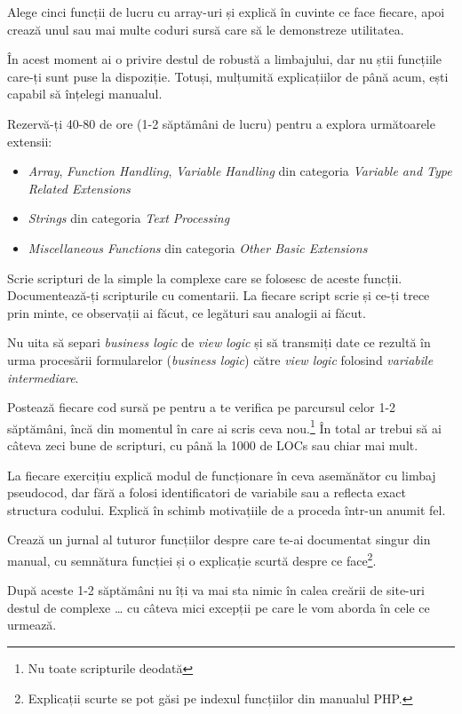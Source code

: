 \begin{Exercise}[title={Înțelege manualul}]
Alege cinci funcții de lucru cu array-uri și
explică în cuvinte ce face fiecare, apoi crează
unul sau mai multe coduri sursă care să le demonstreze
utilitatea.
\end{Exercise}
\begin{Exercise}[difficulty=3,title={Explorează manualul}]
În acest moment ai o privire destul de robustă a
limbajului, dar nu știi funcțiile care-ți sunt
puse la dispoziție. Totuși, mulțumită explicațiilor
de până acum, ești capabil să înțelegi manualul.

Rezervă-ți 40-80 de ore (1-2 săptămâni de lucru)
pentru a explora următoarele extensii:
\begin{itemize}
\item \textit{Array},
\textit{Function Handling}, \textit{Variable Handling} din categoria \textit{Variable and Type Related Extensions}
\item \textit{Strings} din categoria \textit{Text Processing}
\item \textit{Miscellaneous Functions} din categoria \textit{Other Basic Extensions}
\end{itemize}
Scrie scripturi de la simple la complexe care se folosesc
de aceste funcții. Documentează-ți scripturile cu comentarii.
La fiecare script scrie și ce-ți trece prin minte, ce observații
ai făcut, ce legături sau analogii ai făcut.

Nu uita să separi \textit{business logic} de \textit{view logic} și să transmiți date ce
rezultă în urma procesării formularelor (\textit{business logic}) către \textit{view logic}
folosind \textit{variabile intermediare}.

Postează fiecare cod sursă pe {\phpro} pentru a te verifica pe parcursul
celor 1-2 săptămâni, încă din momentul în care ai scris ceva nou.\footnote{Nu toate
scripturile deodată} În total ar trebui să ai câteva zeci bune de scripturi, cu
până la 1000 de LOCs sau chiar mai mult.

La fiecare exercițiu explică modul de funcționare \^in ceva asemănător cu
limbaj pseudocod, dar fără a folosi identificatori de variabile
sau a reflecta exact structura codului. Explică \^in schimb motivațiile
de a proceda \^intr-un anumit fel.

Crează un jurnal al tuturor funcțiilor despre care te-ai documentat
singur din manual, cu semnătura funcției și o explicație scurtă
despre ce face\footnote{Explicații scurte se pot găsi pe indexul
funcțiilor din manualul PHP.}.

După aceste 1-2 săptămâni nu îți va mai sta nimic în calea creării
de site-uri destul de complexe {\ldots} cu câteva mici excepții pe care le vom
aborda \^in cele ce urmează.
\end{Exercise}



